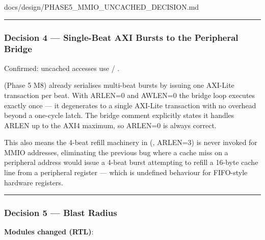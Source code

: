 \begin{relocated}{docs/design/PHASE5_MMIO_UNCACHED_DECISION.md}
\begin{center}\rule{0.5\linewidth}{0.5pt}\end{center}

\subsubsection{Decision 4 --- Single-Beat AXI Bursts to the Peripheral
Bridge}\label{ds:dec:phase5-mmio-uncached:decision-4-single-beat-axi-bursts-to-the-peripheral-bridge}

Confirmed: uncached accesses use  / .

 (Phase 5 M8) already serialises multi-beat
bursts by issuing one AXI-Lite transaction per beat. With ARLEN=0 and
AWLEN=0 the bridge loop executes exactly once --- it degenerates to a
single AXI-Lite transaction with no overhead beyond a one-cycle latch.
The bridge comment explicitly states it handles ARLEN up to the AXI4
maximum, so ARLEN=0 is always correct.

This also means the 4-beat refill machinery in 
(, ARLEN=3) is never invoked for MMIO addresses,
eliminating the previous bug where a cache miss on a peripheral address
would issue a 4-beat burst attempting to refill a 16-byte cache line
from a peripheral register --- which is undefined behaviour for
FIFO-style hardware registers.

\begin{center}\rule{0.5\linewidth}{0.5pt}\end{center}

\subsubsection{Decision 5 --- Blast Radius}\label{ds:dec:phase5-mmio-uncached:decision-5-blast-radius}

\textbf{Modules changed (RTL)}:

{\small\setlength{\tabcolsep}{4pt}

}
\end{relocated}

